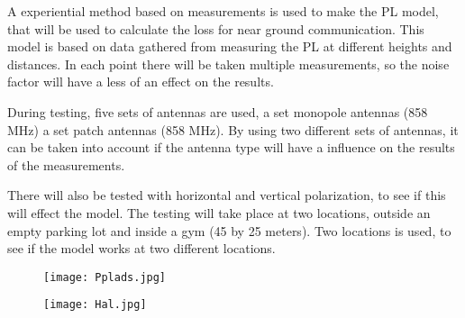 A experiential method based on measurements is used to make the PL model, that will be used to calculate the loss for near ground communication. This model is based on data gathered from measuring the PL at different heights and distances. In each point there will be taken multiple measurements, so the noise factor will have a less of an effect on the results.

During testing, five sets of antennas are used, a set monopole antennas (858 MHz) a set patch antennas (858 MHz). By using two different sets of antennas, it can be taken into account if the antenna type will have a influence on the results of the measurements. 

There will also be tested with horizontal and vertical polarization, to see if this will effect the model. The testing will take place at two locations, outside an empty parking lot and inside a gym (45 by 25 meters). Two locations is used, to see if the model works at two different locations.



\begin{figure}
\centering
\begin{minipage}{.2\textwidth}
  \centering
  \texttt{[image: Pplads.jpg]}
  \label{fig:test1}
\end{minipage}%
\hspace{2mm}
\begin{minipage}{.2\textwidth}
  \centering
  \texttt{[image: Hal.jpg]}
  \label{fig:test2}
\end{minipage}
\end{figure}

